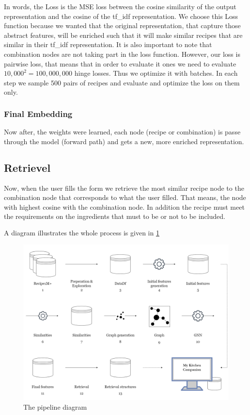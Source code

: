 \documentclass[]{article}
\begin{document}
In words, the Loss is the MSE loss between the cosine similarity of the output representation and the cosine of the tf\_idf representation. We choose this Loss function because we wanted that the original representation, that capture those abstract features, will be enriched such that it will make similar recipes that are similar in their tf\_idf representation. It is also important to note that combination nodes are not taking part in the loss function. However, our loss is pairwise loss, that means that in order to evaluate it ones we need to evaluate $10,000^2 = 100,000,000$ hinge losses. Thus we optimize it with batches. In each step we sample 500 pairs of recipes and evaluate and optimize the loss on them only.

\subsubsection{Final Embedding}
Now after, the weights were learned, each node (recipe or combination) is passe through the model (forward path) and gets a new, more enriched representation.

\subsection{Retrievel}
Now, when the user fills the form we retrieve the most similar recipe node to the combination node that corresponds to what the user filled. That means, the node with highest cosine with the combination node. In addition the recipe must meet the requirements on the ingredients that must to be or not to be included.

A diagram illustrates the whole process is given in \ref{fig:diagram}
\begin{figure}[H]
	\centering
	\includegraphics[width=0.7\linewidth]{"../My kitchen companion/data/others/diagram.png"}
	\caption[s]{The pipeline diagram}
	\label{fig:diagram}
\end{figure}
\pagebreak
\end{document}
